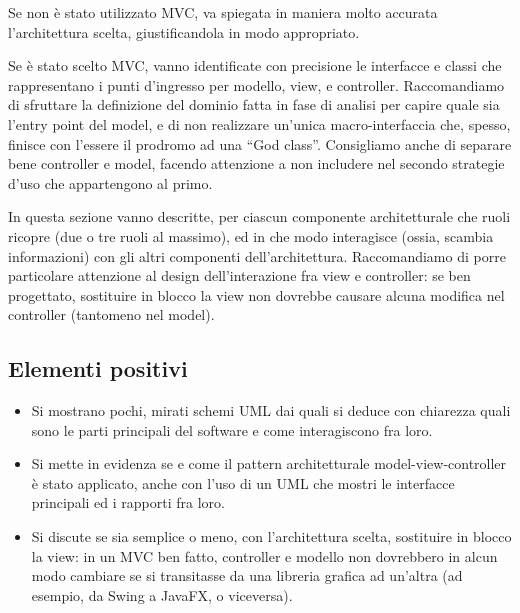 \documentclass[a4paper,12pt]{report}
\begin{document}
Se non è stato utilizzato MVC, va spiegata in maniera molto accurata l'architettura scelta, giustificandola in modo appropriato.

Se è stato scelto MVC, vanno identificate con precisione le interfacce e classi che rappresentano i punti d'ingresso per modello, view, e controller.
Raccomandiamo di sfruttare la definizione del dominio fatta in fase di analisi per capire quale sia l'entry point del model, e di non realizzare un'unica macro-interfaccia che, spesso, finisce con l'essere il prodromo ad una ``God class''.
%
Consigliamo anche di separare bene controller e model, facendo attenzione a non includere nel secondo strategie d'uso che appartengono al primo.

In questa sezione vanno descritte, per ciascun componente architetturale che ruoli ricopre (due o tre ruoli al massimo), ed in che modo interagisce (ossia, scambia informazioni) con gli altri componenti dell'architettura.
%
Raccomandiamo di porre particolare attenzione al design dell'interazione fra view e controller: se ben progettato, sostituire in blocco la view non dovrebbe causare alcuna modifica nel controller (tantomeno nel model).

\subsection*{Elementi positivi}
\begin{itemize}
	\item Si mostrano pochi, mirati schemi UML dai quali si deduce con chiarezza quali sono le parti principali del software e come interagiscono fra loro.
	\item Si mette in evidenza se e come il pattern architetturale model-view-controller è stato applicato, anche con l'uso di un UML che mostri le interfacce principali ed i rapporti fra loro.
	\item Si discute se sia semplice o meno, con l'architettura scelta, sostituire in blocco la view: in un MVC ben fatto, controller e modello non dovrebbero in alcun modo cambiare se si transitasse da una libreria grafica ad un'altra (ad esempio, da Swing a JavaFX, o viceversa).
\end{itemize}
\end{document}
